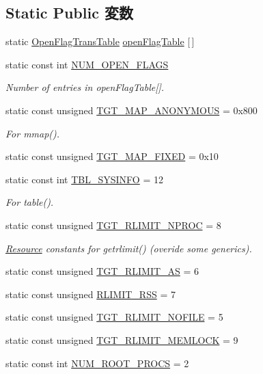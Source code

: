 \subsection*{Static Public 変数}
\begin{DoxyCompactItemize}
\item 
static \hyperlink{structOpenFlagTransTable}{OpenFlagTransTable} \hyperlink{classMipsLinux_ab1db5a531609b99b262cc849ea24765a}{openFlagTable} \mbox{[}$\,$\mbox{]}
\item 
static const int \hyperlink{classMipsLinux_ad85b9918c8f2c8739537a002dc1dc526}{NUM\_\-OPEN\_\-FLAGS}
\begin{DoxyCompactList}\small\item\em Number of entries in openFlagTable\mbox{[}\mbox{]}. \item\end{DoxyCompactList}\item 
static const unsigned \hyperlink{classMipsLinux_a0bbc267200567dd98250b99b6085a499}{TGT\_\-MAP\_\-ANONYMOUS} = 0x800
\begin{DoxyCompactList}\small\item\em For mmap(). \item\end{DoxyCompactList}\item 
static const unsigned \hyperlink{classMipsLinux_a0124e421d7846143bca15728b7a53e14}{TGT\_\-MAP\_\-FIXED} = 0x10
\item 
static const int \hyperlink{classMipsLinux_a02a979126f2aa34bcdfdc6ab92207d3b}{TBL\_\-SYSINFO} = 12
\begin{DoxyCompactList}\small\item\em For table(). \item\end{DoxyCompactList}\item 
static const unsigned \hyperlink{classMipsLinux_af16b609dcc51ebef365e8258e28d777c}{TGT\_\-RLIMIT\_\-NPROC} = 8
\begin{DoxyCompactList}\small\item\em \hyperlink{classResource}{Resource} constants for getrlimit() (overide some generics). \item\end{DoxyCompactList}\item 
static const unsigned \hyperlink{classMipsLinux_a6e372e5f43e2da816e9bbf5088d89c21}{TGT\_\-RLIMIT\_\-AS} = 6
\item 
static const unsigned \hyperlink{classMipsLinux_a9dd9669e602da0f5fa19e0e859309f24}{RLIMIT\_\-RSS} = 7
\item 
static const unsigned \hyperlink{classMipsLinux_a7eca1a56bf2a00dce74320c95a0b176e}{TGT\_\-RLIMIT\_\-NOFILE} = 5
\item 
static const unsigned \hyperlink{classMipsLinux_acfa2b204cbb5bca2fbc2c1f15649aca2}{TGT\_\-RLIMIT\_\-MEMLOCK} = 9
\item 
static const int \hyperlink{classMipsLinux_afaeb843972161edc8d0f4a9360764877}{NUM\_\-ROOT\_\-PROCS} = 2
\end{DoxyCompactItemize}
